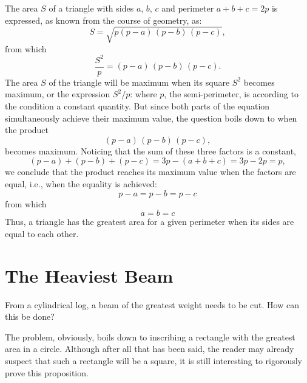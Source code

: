 \ans The area $S$ of a triangle with sides $a$, $b$, $c$ and perimeter $a + b + c = 2p$ is expressed, as known from the course of geometry, as:
\begin{equation*}%
S = \sqrt{p(p - a)\,(p - b)\,(p - c)},
\end{equation*}
from which
\begin{equation*}%
\frac{S^{2}}{p} = (p - a)\,(p - b)\,(p - c).
\end{equation*}
The area $S$ of the triangle will be maximum when its square $S^{2} $ becomes maximum, or the expression $S^{2}/p$: where $p$, the semi-perimeter, is according to the condition a constant quantity. But since both parts of the equation simultaneously achieve their maximum value, the question boils down to when the product
\begin{equation*}%
(p - a)\,(p - b)\,(p - c),
\end{equation*}
becomes maximum. Noticing that the sum of these three factors is a constant,
\begin{equation*}%
(p - a) + (p - b) + (p - c) = 3p - (a + b + c) = 3p - 2p = p,
\end{equation*}
we conclude that the product reaches its maximum value when the factors are equal, i.e., when the equality is achieved:
\begin{equation*}%
p - a = p - b = p - c
\end{equation*}
from which
\begin{equation*}%
a = b = c
\end{equation*}
Thus, a triangle has the greatest area for a given perimeter when its sides are equal to each other.

\section{The Heaviest Beam}
\label{sec-12.11}


\ques From a cylindrical log, a beam of the greatest weight needs to be cut. How can this be done?



\ans The problem, obviously, boils down to inscribing a rectangle with the greatest area in a circle. Although after all that has been said, the reader may already suspect that such a rectangle will be a square, it is still interesting to rigorously prove this proposition.


